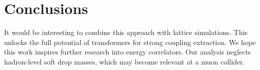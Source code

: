 \section{Conclusions}\label{sec:conclusions}

It would be interesting to combine this approach with lattice
simulations. This unlocks the full potential of transformers for strong
coupling extraction. We hope this work inspires further research into
energy correlators. Our analysis neglects hadron-level soft drop masses,
which may become relevant at a muon collider.

